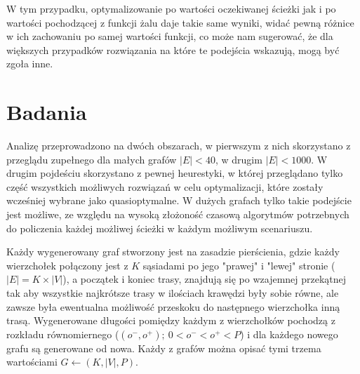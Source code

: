\documentclass[10pt]{article}
\begin{document}
W tym przypadku, optymalizowanie po wartości oczekiwanej ścieżki jak i po wartości pochodzącej z funkcji żalu daje takie same wyniki, widać pewną różnice w ich zachowaniu po samej wartości funkcji, co może nam sugerować, że dla większych przypadków rozwiązania na które te podejścia wskazują, mogą być zgoła inne.

\section{Badania}
Analizę przeprowadzono na dwóch obszarach, w pierwszym z nich skorzystano z przeglądu zupełnego dla małych grafów $|E| < 40$, w drugim $|E| < 1000$. W drugim pojdeściu skorzystano z pewnej heurestyki, w której przeglądano tylko część wszystkich możliwych rozwiązań w celu optymalizacji, które zostały wcześniej wybrane jako quasioptymalne. W dużych grafach tylko takie podejście jest możliwe, ze względu na wysoką złożoność czasową algorytmów potrzebnych do policzenia każdej możliwej ścieżki w każdym możliwym scenariuszu.

Każdy wygenerowany graf stworzony jest na zasadzie pierścienia, gdzie każdy wierzchołek połączony jest z $K$ sąsiadami po jego "prawej" i "lewej" stronie ($|E| = K \times |V|$), a początek i koniec trasy, znajdują się po wzajemnej przekątnej tak aby wszystkie najkrótsze trasy w ilościach krawędzi były sobie równe, ale zawsze była ewentualna możliwość przeskoku do następnego wierzchołka inną trasą. Wygenerowane długości pomiędzy każdym z wierzchołków pochodzą z rozkładu równomiernego ($\left(o^-,  o^+\right);\ 0 < o^- < o^+ < P$) i dla każdego nowego grafu są generowane od nowa. Każdy z grafów można opisać tymi trzema wartościami $G \leftarrow (K, |V|, P)$.
\end{document}
